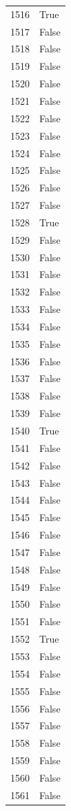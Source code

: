\documentclass[
  letterpaper,
  DIV=11,
  numbers=noendperiod]{scrreprt}
\begin{document}
\begin{tabular}{ll}
1516 &   True \\
1517 &  False \\
1518 &  False \\
1519 &  False \\
1520 &  False \\
1521 &  False \\
1522 &  False \\
1523 &  False \\
1524 &  False \\
1525 &  False \\
1526 &  False \\
1527 &  False \\
1528 &   True \\
1529 &  False \\
1530 &  False \\
1531 &  False \\
1532 &  False \\
1533 &  False \\
1534 &  False \\
1535 &  False \\
1536 &  False \\
1537 &  False \\
1538 &  False \\
1539 &  False \\
1540 &   True \\
1541 &  False \\
1542 &  False \\
1543 &  False \\
1544 &  False \\
1545 &  False \\
1546 &  False \\
1547 &  False \\
1548 &  False \\
1549 &  False \\
1550 &  False \\
1551 &  False \\
1552 &   True \\
1553 &  False \\
1554 &  False \\
1555 &  False \\
1556 &  False \\
1557 &  False \\
1558 &  False \\
1559 &  False \\
1560 &  False \\
1561 &  False \\

\end{tabular}
\end{document}
